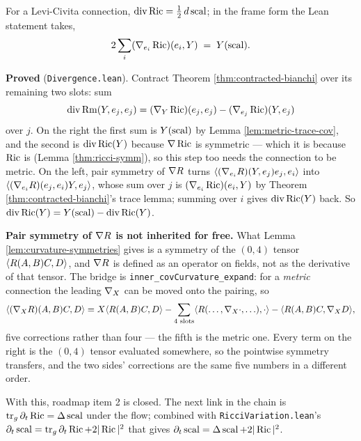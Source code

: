\begin{theorem}
  \label{thm:div-ricci}
  \leanok
  For a Levi-Civita connection,
  $\operatorname{div}\operatorname{Ric} = \tfrac12\, d\operatorname{scal}$; in the frame form the Lean
  statement takes,
  \[
    2 \sum_i (\nabla_{e_i}\operatorname{Ric})(e_i, Y) \;=\; Y(\operatorname{scal}).
  \]

  \textbf{Proved} (\texttt{Divergence.lean}). Contract Theorem
  \ref{thm:contracted-bianchi} over its remaining two slots: sum
  \[
    \operatorname{div}\operatorname{Rm}(Y,e_j,e_j) = (\nabla_Y\operatorname{Ric})(e_j,e_j) -
    (\nabla_{e_j}\operatorname{Ric})(Y,e_j)
  \]
  over $j$. On the right the first sum is $Y(\operatorname{scal})$ by Lemma
  \ref{lem:metric-trace-cov}, and the second is $\operatorname{div}\operatorname{Ric}(Y)$
  because $\nabla\operatorname{Ric}$ is symmetric --- which it is because $\operatorname{Ric}$ is (Lemma
  \ref{thm:ricci-symm}), so this step too needs the connection to be
  metric. On the left, pair symmetry of $\nabla R$ turns $\langle
  (\nabla_{e_i}R)(Y,e_j)e_j, e_i\rangle$ into $\langle
  (\nabla_{e_i}R)(e_j,e_i)Y, e_j\rangle$, whose sum over $j$ is
  $(\nabla_{e_i}\operatorname{Ric})(e_i,Y)$ by Theorem \ref{thm:contracted-bianchi}'s trace
  lemma; summing over $i$ gives $\operatorname{div}\operatorname{Ric}(Y)$ back. So
  $\operatorname{div}\operatorname{Ric}(Y) = Y(\operatorname{scal}) - \operatorname{div}\operatorname{Ric}(Y)$.

  \textbf{Pair symmetry of $\nabla R$ is not inherited for free.} What Lemma
  \ref{lem:curvature-symmetries} gives is a symmetry of the $(0,4)$ tensor
  $\langle R(A,B)C,D\rangle$, and $\nabla R$ is defined as an operator on
  fields, not as the derivative of that tensor. The bridge is
  \texttt{inner\_covCurvature\_expand}: for a \emph{metric} connection the
  leading $\nabla_X$ can be moved onto the pairing, so
  \[
    \langle (\nabla_XR)(A,B)C, D\rangle
      = X\langle R(A,B)C,D\rangle - \sum_{\text{4 slots}} \langle
      R(\ldots,\nabla_X\cdot,\ldots),\cdot\rangle - \langle R(A,B)C,
      \nabla_X D\rangle,
  \]
  five corrections rather than four --- the fifth is the metric one. Every term
  on the right is the $(0,4)$ tensor evaluated somewhere, so the pointwise
  symmetry transfers, and the two sides' corrections are the same five numbers
  in a different order.

  With this, roadmap item 2 is closed. The next link in the chain is
  $\operatorname{tr}_g \partial_t \operatorname{Ric} = \Delta \operatorname{scal}$ under the flow; combined
  with \texttt{RicciVariation.lean}'s $\partial_t \operatorname{scal} = \operatorname{tr}_g
  \partial_t\operatorname{Ric} + 2|\operatorname{Ric}|^2$ that gives $\partial_t \operatorname{scal} = \Delta \operatorname{scal} +
  2|\operatorname{Ric}|^2$.
\end{theorem}

